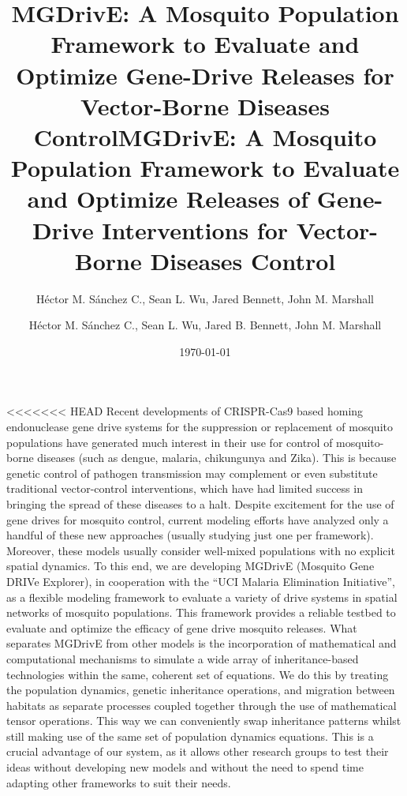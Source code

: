 \documentclass[11pt]{amsart}
\title{MGDrivE:  A Mosquito Population Framework to Evaluate and Optimize Gene-Drive Releases for Vector-Borne Diseases Control}
\author{H\'{e}ctor M. S\'{a}nchez C., Sean L. Wu, Jared Bennett, John M. Marshall}
\title{MGDrivE: A Mosquito Population Framework to Evaluate and Optimize Releases of Gene-Drive Interventions for Vector-Borne Diseases Control}
\author{H\'{e}ctor M. S\'{a}nchez C., Sean L. Wu, Jared B. Bennett, John M. Marshall}
\date{\today}
\begin{document}
\maketitle


<<<<<<< HEAD
Recent developments of CRISPR-Cas9 based homing endonuclease gene drive systems for the suppression or replacement of mosquito populations have generated much interest in their use for control of mosquito-borne diseases (such as dengue, malaria, chikungunya and Zika). This is because genetic control of pathogen transmission may complement or even substitute traditional vector-control interventions,  which have had limited success in bringing the spread of these diseases to a halt. Despite excitement for the use of gene drives for mosquito control,  current modeling efforts have analyzed only a handful of these new approaches (usually studying just one per framework). Moreover, these models usually consider well-mixed populations with no explicit spatial dynamics. To this end, we are developing MGDrivE (Mosquito Gene DRIVe Explorer), in cooperation with the ``UCI Malaria Elimination Initiative'', as a flexible modeling framework to evaluate a variety of drive systems in spatial networks of mosquito populations. This framework provides a reliable testbed to evaluate and optimize the efficacy of gene drive mosquito releases. What separates MGDrivE from other models is the incorporation of mathematical and computational mechanisms to simulate a wide array of inheritance-based technologies within the same, coherent set of equations. We do this by treating the population dynamics, genetic inheritance operations, and migration between habitats as separate processes coupled together through the use of mathematical tensor operations. This way we can conveniently swap inheritance patterns whilst still making use of the same set of population dynamics equations.  This is a crucial advantage of our system, as it allows other research groups to test their ideas without developing new models and without the need to spend time adapting other frameworks to suit their needs.
\end{document}
